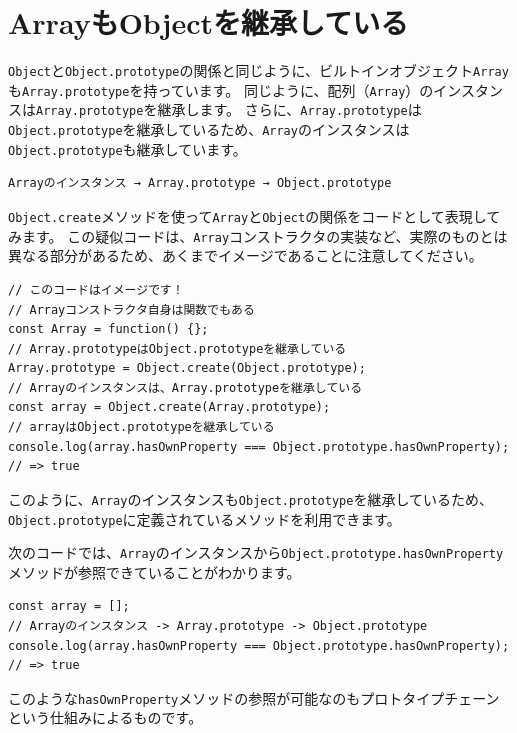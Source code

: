 \hypertarget{inherit-object}{%
\section{ArrayもObjectを継承している}\label{inherit-object}}

\texttt{Object}と\texttt{Object.prototype}の関係と同じように、ビルトインオブジェクト\texttt{Array}も\texttt{Array.prototype}を持っています。
同じように、配列（\texttt{Array}）のインスタンスは\texttt{Array.prototype}を継承します。
さらに、\texttt{Array.prototype}は\texttt{Object.prototype}を継承しているため、\texttt{Array}のインスタンスは\texttt{Object.prototype}も継承しています。

\begin{lstlisting}
Arrayのインスタンス → Array.prototype → Object.prototype
\end{lstlisting}

\texttt{Object.create}メソッドを使って\texttt{Array}と\texttt{Object}の関係をコードとして表現してみます。
この疑似コードは、\texttt{Array}コンストラクタの実装など、実際のものとは異なる部分があるため、あくまでイメージであることに注意してください。

\begin{lstlisting}
// このコードはイメージです！
// Arrayコンストラクタ自身は関数でもある
const Array = function() {};
// Array.prototypeはObject.prototypeを継承している
Array.prototype = Object.create(Object.prototype);
// Arrayのインスタンスは、Array.prototypeを継承している
const array = Object.create(Array.prototype);
// arrayはObject.prototypeを継承している
console.log(array.hasOwnProperty === Object.prototype.hasOwnProperty); 
// => true
\end{lstlisting}

このように、\texttt{Array}のインスタンスも\texttt{Object.prototype}を継承しているため、
\texttt{Object.prototype}に定義されているメソッドを利用できます。

次のコードでは、\texttt{Array}のインスタンスから\texttt{Object.prototype.hasOwnProperty}メソッドが参照できていることがわかります。

\begin{lstlisting}
const array = [];
// Arrayのインスタンス -> Array.prototype -> Object.prototype
console.log(array.hasOwnProperty === Object.prototype.hasOwnProperty); 
// => true
\end{lstlisting}

このような\texttt{hasOwnProperty}メソッドの参照が可能なのもプロトタイプチェーンという仕組みによるものです。

